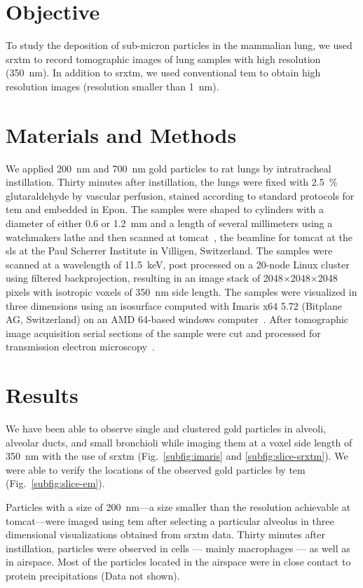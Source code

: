 \section{Objective}
To study the deposition of sub-micron particles in the mammalian lung, we used \ac{srxtm} to record tomographic images of lung samples with high resolution (\SI{350}{\nano\meter}). In addition to \ac{srxtm}, we used conventional \ac{tem} to obtain high resolution images (resolution smaller than \SI{1}{\nano\meter}).

\section{Materials and Methods}
We applied \SI{200}{\nano\meter} and \SI{700}{\nano\meter} gold particles to rat lungs by intratracheal instillation. Thirty minutes after instillation, the lungs were fixed with \SI{2.5}{\%} glutaraldehyde by vascular perfusion, stained according to standard protocols for \ac{tem} and embedded in Epon. The samples were shaped to cylinders with a diameter of either 0.6 or \SI{1.2}{\milli\meter} and a length of several millimeters using a watchmakers lathe and then scanned at \ac{tomcat}~\cite{Stampanoni2007}, the beamline for \acl{tomcat} at the \acl{sls} at the Paul Scherrer Institute in Villigen, Switzerland. The samples were scanned at a wavelength of \SI{11.5}{\kilo\electronvolt}, post processed on a 20-node Linux cluster using filtered backprojection, resulting in an image stack of 2048$\times$2048$\times$2048 pixels with isotropic voxels of \SI{350}{\nano\meter} side length. The samples were visualized in three dimensions using an isosurface computed with Imaris x64 5.72 (Bitplane AG, Switzerland) on an AMD 64-based windows computer~\cite{Tsuda2008}. After tomographic image acquisition serial sections of the sample were cut and processed for transmission electron microscopy~\cite{Mund2008}. 

\section{Results}
We have been able to observe single and clustered gold particles in alveoli, alveolar ducts, and small bronchioli while imaging them at a voxel side length of \SI{350}{\nano\meter} with the use of \ac{srxtm} (Fig.~\ref{subfig:imaris} and \ref{subfig:slice-srxtm}). We were able to verify the locations of the observed gold particles by \ac{tem} (Fig.~\ref{subfig:slice-em}). 

Particles with a size of \SI{200}{\nano\meter}---a size smaller than the resolution achievable at \ac{tomcat}---were imaged using \ac{tem} after selecting a particular alveolus in three dimensional visualizations obtained from \ac{srxtm} data. Thirty minutes after instillation, particles were observed in cells --- mainly macrophages --- as well as in airspace. Most of the particles located in the airspace were in close contact to protein precipitations (Data not shown).

